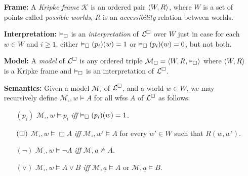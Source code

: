 \documentclass[a4paper, 11pt]{article} %
\begin{document}
\begin{enumerate}[leftmargin=1.2in] %
	\item[\bf Frame:] A \textit{Kripke frame} $\mathcal{K}$ is an ordered pair $\langle W,R\rangle$, where $W$ is a set of points called \textit{possible worlds}, $R$ is an \textit{accessibility} relation between worlds.
	\item[\bf Interpretation:] $\vDash_{\square}$ is an \textit{interpretation} of $\mathcal{L}^{\square}$ over $W$ just in case for each $w\in W$ and $i\geq1$, either $\vDash_{\square}(p_i)(w)=1$ or $\vDash_{\square}(p_i)(w)=0$, but not both.
	\item[\bf Model:] A \textit{model} of $\mathcal{L}^{\square}$ is any ordered triple $\mathcal{M}_\square=\langle W,R,\vDash_{\square}\rangle$ where $\langle W,R\rangle$ is a Kripke frame and $\vDash_{\square}$ is an interpretation of $\mathcal{L}^{\square}$.
	\item[\bf Semantics:] Given a model $\mathcal{M}_\square$ of $\mathcal{L}^{\square}$, and a world $w\in W$, we may recursively define $\mathcal{M}_\square,w\vDash A$ for all wfss $A$ of $\mathcal{L}^{\square}$ as follows:
	      \begin{small}
		      \begin{itemize}[leftmargin=.36in]
			      \item[$(p_i)$] $\mathcal{M}_\square,w\vDash  p_i$ \textit{iff} $\vDash_{\square}(p_i)(w)=1$.
			      \item[$(\hspace{.3pt}\Box\hspace{.3pt})$] $\mathcal{M}_\square,w\vDash  \Box A$ \textit{iff} $\mathcal{M}_\square,w'\vDash A$ for every $w'\in W$ such that $R(w,w')$.
			      \item[$(\neg)$] $\mathcal{M}_\square,w\vDash  \neg A$ \textit{iff} $\mathcal{M},\underline{a}\nvDash A$.
			      \item[$(\vee)$] $\mathcal{M}_\square,w\vDash  A\vee B$ \textit{iff} $\mathcal{M},\underline{a}\vDash  A$ or $\mathcal{M},\underline{a}\vDash  B$.

\end{itemize}
\end{small}
\end{enumerate}
\end{document}
